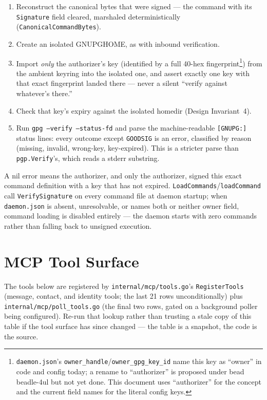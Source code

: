 \documentclass[a4paper,10pt,fleqn]{article}
\begin{document}
\begin{enumerate}
  \item Reconstruct the canonical bytes that were signed --- the
    command with its \texttt{Signature} field cleared, marshaled
    deterministically (\texttt{CanonicalCommandBytes}).
  \item Create an isolated GNUPGHOME, as with inbound verification.
  \item Import \emph{only} the authorizer's key (identified by a full
    40-hex fingerprint\footnote{\texttt{daemon.json}'s
    \texttt{owner\_handle}/\texttt{owner\_gpg\_key\_id} name this key
    as ``owner'' in code and config today; a rename to
    ``authorizer'' is proposed under bead beadle-4ul but not yet
    done.  This document uses ``authorizer'' for the concept and the
    current field names for the literal config keys.}) from the
    ambient keyring into the isolated one, and assert exactly one key
    with that exact fingerprint landed there --- never a silent
    ``verify against whatever's there.''
  \item Check that key's expiry against the isolated homedir (Design
    Invariant~4).
  \item Run \texttt{gpg --verify --status-fd} and parse the
    machine-readable \texttt{[GNUPG:]} status lines: every outcome
    except \texttt{GOODSIG} is an error, classified by reason
    (missing, invalid, wrong-key, key-expired).  This is a stricter
    parse than \texttt{pgp.Verify}'s, which reads a stderr substring.
\end{enumerate}

A nil error means the authorizer, and only the authorizer, signed this
exact command definition with a key that has not expired.
\texttt{LoadCommands}/\texttt{loadCommand} call \texttt{VerifySignature}
on every command file at daemon startup; when \texttt{daemon.json} is
absent, unresolvable, or names both or neither owner field, command
loading is disabled entirely --- the daemon starts with zero commands
rather than falling back to unsigned execution.

\section{MCP Tool Surface}

The tools below are registered by \texttt{internal/mcp/tools.go}'s
\texttt{RegisterTools} (message, contact, and identity tools; the last
21 rows unconditionally) plus \texttt{internal/mcp/poll\_tools.go}
(the final two rows, gated on a background poller being configured).
Re-run that lookup rather than trusting a stale copy of this table if
the tool surface has since changed --- the table is a snapshot, the
code is the source.
\end{document}
